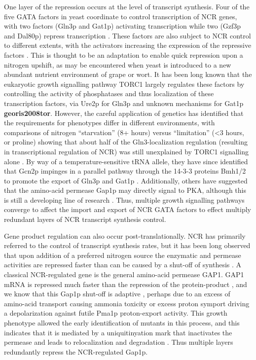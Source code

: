 One layer of
the repression occurs at the level of transcript synthesis. Four of
the five GATA factors in yeast coordinate to control transcription of
NCR genes, with two factors (Gln3p and Gat1p) activating transcription
while two (Gzf3p and Dal80p) repress transcription 
\parencite{hahn2011transcriptional,stanbrough1995transcriptional,daugherty1993regulatory,scherens2006identification}. 
These factors are also subject to NCR
control to different extents, with the activators increasing the
expression of the repressive factors 
\parencite{cunningham2000nitrogen}. 
This is thought to be an
adaptation to enable quick repression upon a nitrogen upshift, as may
be encountered when yeast is introduced to a new abundant nutrient
environment of grape or wort. It has been long known that the
eukaryotic growth signalling pathway TORC1 largely regulates these
factors by controlling the activity of phosphatases and thus
localization of these transcription factors, via Ure2p for Gln3p 
\parencite{beck1999tor,cox2000saccharomyces} 
and unknown mechanisms for Gat1p
\textbf{georis2008tor}. 
However, the careful application of genetics has identified that the
requirements for phenotypes differ in different environments, with
comparisons of nitrogen “starvation” (8+ hours) versus “limitation”
(<3 hours, or proline) showing that about half of the
Gln3-localization regulation (resulting in transcriptional regulation
of NCR) was still unexplained by TORC1 signalling alone
\parencite{tate2013five}. By way
of a temperature-sensitive tRNA allele, they have since identified
that Gcn2p impinges in a parallel pathway through the 14-3-3 proteins
Bmh1/2 to promote the export of Gln3p and Gat1p 
\parencite{tate2015gata,tate2017general}. 
Additionally, others have suggested that the
amino-acid permease Gap1p may directly signal to PKA, although this is
still a developing line of research
\parencite{donaton2003gap1,van2009transport}.
Thus, multiple growth signalling pathways converge to
affect the import and export of NCR GATA factors to effect multiply
redundant layers of NCR transcript synthesis control.  

Gene product
regulation can also occur post-translationally. NCR has primarily
referred to the control of transcript synthesis rates, but it has been
long observed that upon addition of a preferred nitrogen source the
enzymatic and permease activities are repressed faster than can be
caused by a shut-off of synthesis 
\parencite{cooper1983function}. A
classical NCR-regulated gene is the general amino-acid permease GAP1.
GAP1 mRNA is repressed much faster than the repression of the
protein-product 
\parencite{stanbrough1995transcriptional}, and we know that this
Gap1p shut-off is adaptive \parencite{risinger2006activity}, 
perhaps due to an
excess of amino-acid transport causing ammonia toxicity 
\parencite{hess2006ammonium}
or excess proton symport driving a depolarization against futile
Pma1p proton-export activity. This growth phenotype allowed the early
identification of mutants in this process, and this indicates that it
is mediated by a uniquitinyation mark that inactivates the permease
and leads to relocalization and degradation 
\parencite{grenson1983inactivation,risinger2008different,merhi2012internal}. 
Thus multiple layers redundantly repress the NCR-regulated Gap1p.  

